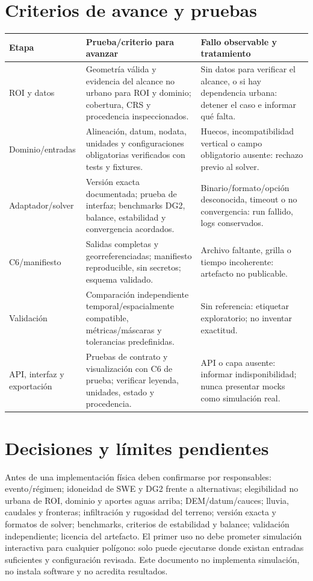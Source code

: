 \documentclass[11pt,a4paper]{article}
\begin{document}
\section{Criterios de avance y pruebas}
\begin{longtable}{p{.18\linewidth}p{.34\linewidth}p{.36\linewidth}}
\toprule Etapa & Prueba/criterio para avanzar & Fallo observable y tratamiento \\\midrule
ROI y datos & Geometría válida y evidencia del alcance no urbano para ROI y dominio; cobertura, CRS y procedencia inspeccionados. & Sin datos para verificar el alcance, o si hay dependencia urbana: detener el caso e informar qué falta. \\
Dominio/entradas & Alineación, datum, nodata, unidades y configuraciones obligatorias verificados con tests y fixtures. & Huecos, incompatibilidad vertical o campo obligatorio ausente: rechazo previo al solver. \\
Adaptador/solver & Versión exacta documentada; prueba de interfaz; benchmarks DG2, balance, estabilidad y convergencia acordados. & Binario/formato/opción desconocida, timeout o no convergencia: run fallido, logs conservados. \\
C6/manifiesto & Salidas completas y georreferenciadas; manifiesto reproducible, sin secretos; esquema validado. & Archivo faltante, grilla o tiempo incoherente: artefacto no publicable. \\
Validación & Comparación independiente temporal/espacialmente compatible, métricas/máscaras y tolerancias predefinidas. & Sin referencia: etiquetar exploratorio; no inventar exactitud. \\
API, interfaz y exportación & Pruebas de contrato y visualización con C6 de prueba; verificar leyenda, unidades, estado y procedencia. & API o capa ausente: informar indisponibilidad; nunca presentar mocks como simulación real. \\
\bottomrule
\end{longtable}

\section{Decisiones y límites pendientes}
Antes de una implementación física deben confirmarse por responsables: evento/régimen; idoneidad de SWE y DG2 frente a alternativas; elegibilidad no urbana de ROI, dominio y aportes aguas arriba; DEM/datum/cauces; lluvia, caudales y fronteras; infiltración y rugosidad del terreno; versión exacta y formatos de solver; benchmarks, criterios de estabilidad y balance; validación independiente; licencia del artefacto. El primer uso no debe prometer simulación interactiva para cualquier polígono: solo puede ejecutarse donde existan entradas suficientes y configuración revisada. Este documento no implementa simulación, no instala software y no acredita resultados.
\end{document}
